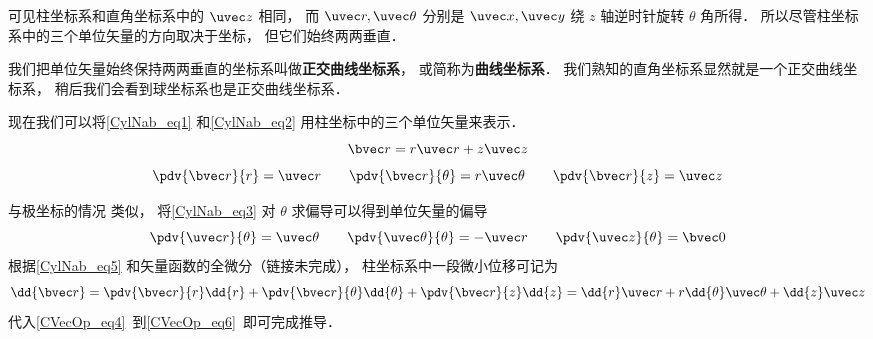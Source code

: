 可见柱坐标系和直角坐标系中的 $\uvec z$ 相同， 而 $\uvec r, \uvec \theta$ 分别是 $\uvec x, \uvec y$ 绕 $z$ 轴逆时针旋转 $\theta$ 角所得． 所以尽管柱坐标系中的三个单位矢量的方向取决于坐标， 但它们始终两两垂直．

我们把单位矢量始终保持两两垂直的坐标系叫做\textbf{正交曲线坐标系}， 或简称为\textbf{曲线坐标系}． 我们熟知的直角坐标系显然就是一个正交曲线坐标系， 稍后我们会看到球坐标系也是正交曲线坐标系．

现在我们可以将\autoref{CylNab_eq1} 和\autoref{CylNab_eq2} 用柱坐标中的三个单位矢量来表示．
\begin{equation}
\bvec r = r\uvec r + z\uvec z
\end{equation}
\begin{equation}\label{CylNab_eq5}
\pdv{\bvec r}{r} = \uvec r \qquad \pdv{\bvec r}{\theta} = r\uvec \theta \qquad \pdv{\bvec r}{z} = \uvec z
\end{equation}

与极坐标的情况 类似， 将\autoref{CylNab_eq3} 对 $\theta$ 求偏导可以得到单位矢量的偏导
\begin{equation}
\pdv{\uvec r}{\theta} = \uvec \theta \qquad
\pdv{\uvec \theta}{\theta} = -\uvec r \qquad
\pdv{\uvec z}{\theta} = \bvec 0
\end{equation}
根据\autoref{CylNab_eq5} 和矢量函数的全微分（链接未完成）， 柱坐标系中一段微小位移可记为
\begin{equation}\label{CylNab_eq7}
\dd{\bvec r} = \pdv{\bvec r}{r}\dd{r} + \pdv{\bvec r}{\theta}\dd{\theta} + \pdv{\bvec r}{z}\dd{z} = \dd{r}\uvec r + r\dd{\theta} \uvec \theta + \dd{z} \uvec z
\end{equation}
代入\autoref{CVecOp_eq4}~到\autoref{CVecOp_eq6}~即可完成推导．
